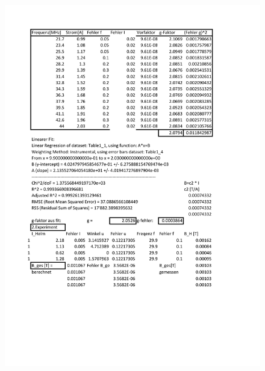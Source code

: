 \documentclass[a4paper,10pt]{scrartcl} %
\begin{document}
\begin{figure}
\label{fig:wertetabelle}
\begin{minipage}{0.65\textwidth}
	\includegraphics[width=\textwidth]{Daten/Tabelle.pdf}
\end{minipage}
\begin{minipage}{0.65\textwidth}

\end{minipage}
\end{figure}
\end{document}
